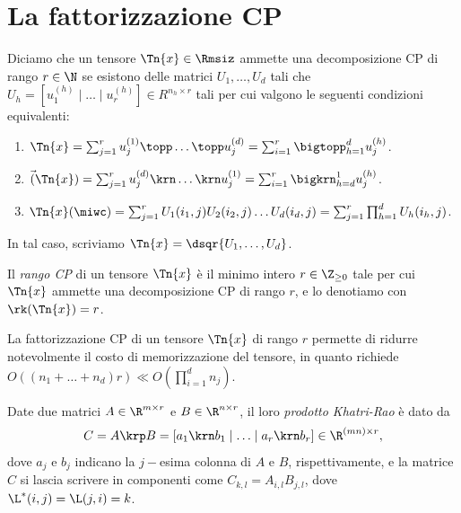 \section{La fattorizzazione CP}
\begin{definition}
\label{def:CP}
  Diciamo che un tensore $ \Tn{x} \in \Rmsiz $ ammette una decomposizione CP di rango $ r\in \N $ se
  esistono delle matrici $ U_1, \ldots, U_d $ tali che $ U_h = \left[ u_1^{(h)} \mid \ldots \mid u_r^{(h)}\right]\in R^{n_h \times r} $ tali per cui
  valgono le seguenti condizioni equivalenti:
  \begin{enumerate}[label=(\roman*)]
    \item $ \Tn{x} = \sum_{j=1}^r u_j^{(1)} \topp \ldots \topp u_j^{(d)} = \sum_{i=1}^r
      \bigtopp_{h=1}^d u_j^{(h)}$.
    \item $ \vec(\Tn{x}) = \sum_{j=1}^r u_j^{(d)} \krn \ldots \krn u_j^{(1)} = \sum_{i=1}^r
      \bigkrn_{h=d}^1 u_j^{(h)}$.
    \item $\Tn{x}(\miwc) = \sum_{j=1}^r U_1(i_1,j)U_2(i_2,j)\ldots U_d(i_d,j) = \sum_{j=1}^r
      \prod_{h=1}^d U_h(i_h,j)$.
  \end{enumerate}
  In tal caso, scriviamo $ \Tn{x} = \dsqr{U_1, \ldots, U_d} $.
\end{definition}



\begin{definition}
Il \emph{rango CP} di un tensore $ \Tn{x} $ è il minimo intero $ r \in \Z_{\ge 0} $ tale per cui $
\Tn{x} $ ammette una decomposizione CP di rango $ r $, e lo denotiamo con $ \rk(\Tn{x}) = r$.
\end{definition}

\begin{remark}
  La fattorizzazione CP di un tensore $ \Tn{x} $ di rango $ r $ permette di ridurre notevolmente il
  costo di memorizzazione del tensore, in quanto richiede $ O((n_1 + \ldots + n_d)r) \ll
  O(\prod_{i=1}^d n_j)$.
\end{remark}


\begin{definition}
  Date due matrici $ A \in \R^{m \times r} $ e $ B \in \R^{n \times r} $, il loro \emph{prodotto
  Khatri-Rao} è dato da
  \begin{equation}
    C = A \krp B = \left[ a_1 \krn b_1 \mid \ldots \mid a_r \krn b_r \right] \in \R^{(mn) \times r},
  \end{equation}
  dove $ a_j $ e $ b_j $ indicano la $ j-$esima colonna di $ A $ e $ B $, rispettivamente, e la matrice $ C $
  si lascia scrivere in componenti come $ C_{k,l} = A_{i,l}B_{j,l} $, dove $ \L^*(i,j) = \L(j,i) = k $.
\end{definition}

